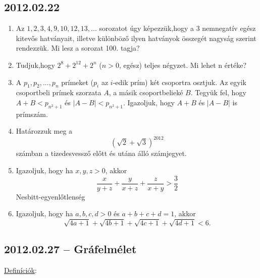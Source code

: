 \subsection*{2012.02.22}
\begin{enumerate}
\item Az $1,2,3,4,9,10,12,13,...$ sorozatot úgy képezzük,hogy a $3$ nemnegatív egész kitevős hatványait, illetve különböző ilyen hatványok összegét nagyság szerint rendezzük. Mi lesz a sorozat 100. tagja?
\item Tudjuk,hogy $2^8+2^{12}+2^n$ ($n>0$, egész) teljes négyzet. Mi lehet n értéke?
\item A $p_1,p_2,...,p_n$ prímeket ($p_i$ az $i$-edik prím) két csoportra osztjuk. Az egyik csoportbeli prímek szorzata $A$, a másik csoportbelieké $B$. Tegyük fel, hogy $A+B< p_{n^2+1}$ és $|A-B| < p_{n^2+1}$. Igazoljuk, hogy $A+B$ és $|A-B|$ is prímszám. 
\item Határozzuk meg a $$(\sqrt{2}+\sqrt{3})^{2012}$$ számban a tizedesvessző előtt és utána álló számjegyet.
\item Igazoljuk, hogy ha $x,y,z>0$, akkor $$\frac{x}{y+z}+\frac{y}{x+z}+\frac{z}{x+y}>\frac{3}{2}$$ Nesbitt-egyenlőtlenség
\item Igazoljuk, hogy ha $a,b,c,d>0$ és $a+b+c+d=1$, akkor $$\sqrt{4a+1}+\sqrt{4b+1}+\sqrt{4c+1}+\sqrt{4d+1}<6.$$ 
\end{enumerate}


\subsection*{2012.02.27 -- Gráfelmélet }
\underline{Definíciók}:


